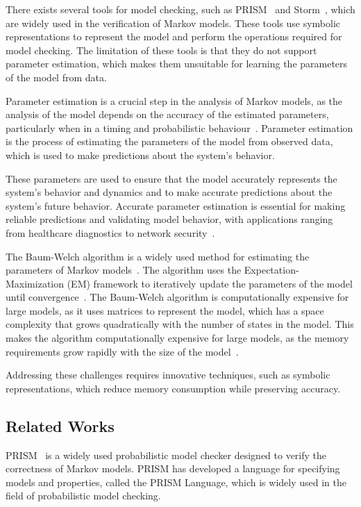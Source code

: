 There exists several tools for model checking, such as PRISM~\cite{kwiatkowska2011prism} and Storm~\cite{hensel2021probabilistic}, which are widely used in the verification of Markov models.
These tools use symbolic representations to represent the model and perform the operations required for model checking.
The limitation of these tools is that they do not support parameter estimation, which makes them unsuitable for learning the parameters of the model from data.

Parameter estimation is a crucial step in the analysis of Markov models, as the analysis of the model depends on the accuracy of the estimated parameters, particularly when in a timing and probabilistic behaviour~\cite{bacci2023mm}.
Parameter estimation is the process of estimating the parameters of the model from observed data, which is used to make predictions about the system's behavior.

These parameters are used to ensure that the model accurately represents the system's behavior and dynamics and to make accurate predictions about the system's future behavior.
Accurate parameter estimation is essential for making reliable predictions and validating model behavior, with applications ranging from healthcare diagnostics to network security~\cite{bacci2023mm}.

The Baum-Welch algorithm is a widely used method for estimating the parameters of Markov models~\cite{kenny2014deep}.
The algorithm uses the Expectation-Maximization (EM) framework to iteratively update the parameters of the model until convergence~\cite{levinson1983introduction}.
The Baum-Welch algorithm is computationally expensive for large models, as it uses matrices to represent the model, which has a space complexity that grows quadratically with the number of states in the model.
This makes the algorithm computationally expensive for large models, as the memory requirements grow rapidly with the size of the model~\cite{davis2004comparing}.

Addressing these challenges requires innovative techniques, such as symbolic representations, which reduce memory consumption while preserving accuracy.

\subsection{Related Works}\label{subsec:related-works}
PRISM~\cite{kwiatkowska2011prism} is a widely used probabilistic model checker designed to verify the correctness of Markov models.
PRISM has developed a language for specifying models and properties, called the PRISM Language, which is widely used in the field of probabilistic model checking.

